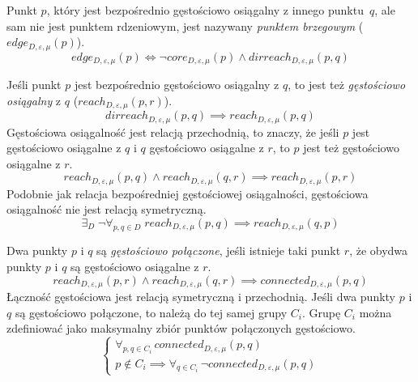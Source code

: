 \pagebreak Punkt $ p $, który jest bezpośrednio gęstościowo osiągalny z innego \mbox{punktu $ q $}, ale sam nie jest punktem rdzeniowym, jest nazywany \textit{punktem brzegowym} ($ edge_{D,\varepsilon,\mu}(p) $).
\begin{equation}\label{edge-point}
	edge_{D,\varepsilon,\mu}(p) \iff \neg core_{D,\varepsilon,\mu}(p) \land dirreach_{D,\varepsilon,\mu}(p,q)
\end{equation}

Jeśli punkt $ p $ jest bezpośrednio gęstościowo osiągalny z $ q $, to jest też \textit{gęstościowo osiągalny} z $ q $ ($ reach_{D,\varepsilon,\mu}(p, r) $). 
\begin{equation}
	dirreach_{D,\varepsilon,\mu}(p, q) \implies reach_{D,\varepsilon,\mu}(p, q)
\end{equation}
Gęstościowa osiągalność jest relacją przechodnią, to znaczy, że jeśli $ p $ jest gęstościowo osiągalne z $ q $  i $ q $ gęstościowo osiągalne z $ r $, to $ p $ jest też gęstościowo osiągalne z $ r $.
\begin{equation}
	reach_{D,\varepsilon,\mu}(p, q) \land reach_{D,\varepsilon,\mu}(q, r) \implies reach_{D,\varepsilon,\mu}(p, r)
\end{equation}
Podobnie jak relacja bezpośredniej gęstościowej osiągalności, gęstościowa osiągalność nie jest relacją symetryczną.
\begin{equation}
	\exists_D\;\neg\forall_{p,q\in D}\;reach_{D,\varepsilon,\mu}(p, q) \implies reach_{D,\varepsilon,\mu}(q, p)
\end{equation}

Dwa punkty $ p $ i $ q $ są \textit{gęstościowo połączone}, jeśli istnieje taki punkt $ r $, że obydwa punkty $ p $ i $ q $ są gęstościowo osiągalne z $ r $.
\begin{equation}
	reach_{D,\varepsilon,\mu}(p, r) \land reach_{D,\varepsilon,\mu}(q, r) \implies connected_{D,\varepsilon,\mu}(p, q)
\end{equation}
Łączność gęstościowa jest relacją symetryczną i przechodnią. Jeśli dwa punkty $ p $ i $ q $ są gęstościowo połączone, to należą do tej samej grupy $ C_i $. Grupę $ C_i $ można zdefiniować jako maksymalny zbiór punktów połączonych gęstościowo.
\begin{equation}\label{eq:cluster-def}
	\begin{cases} 
		\forall_{p, q \in C_i} \, connected_{D,\varepsilon,\mu}(p,q) \\
		p \notin C_i \implies \forall_{q \in C_i} \, \neg connected_{D,\varepsilon,\mu}(p, q)
	\end{cases}
\end{equation}

